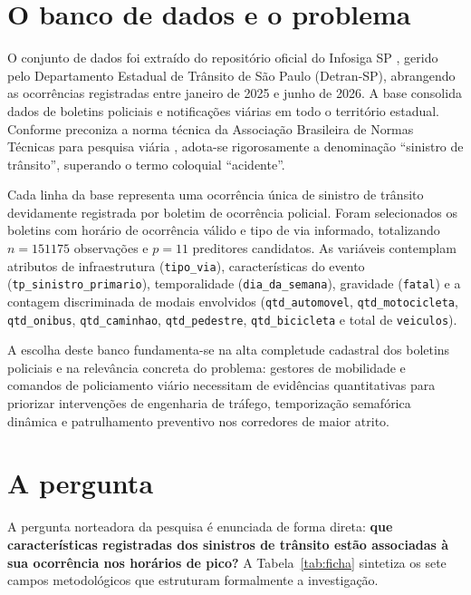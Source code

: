 \documentclass[
  article,
  12pt,
  oneside,
  a4paper,
  english,
  brazil
]{abntex2}\usepackage[]{graphicx}\usepackage[]{xcolor}
\begin{document}
\section{O banco de dados e o problema}

O conjunto de dados foi extraído do repositório oficial do Infosiga SP \cite{fonte_dados}, gerido pelo Departamento Estadual de Trânsito de São Paulo (Detran-SP), abrangendo as ocorrências registradas entre janeiro de 2025 e junho de 2026. A base consolida dados de boletins policiais e notificações viárias em todo o território estadual. Conforme preconiza a norma técnica da Associação Brasileira de Normas Técnicas para pesquisa viária \cite{abnt10697}, adota-se rigorosamente a denominação ``sinistro de trânsito'', superando o termo coloquial ``acidente''.

Cada linha da base representa uma ocorrência única de sinistro de trânsito devidamente registrada por boletim de ocorrência policial. Foram selecionados os boletins com horário de ocorrência válido e tipo de via informado, totalizando $n = \text{151175}$ observações e $p = \text{11}$ preditores candidatos. As variáveis contemplam atributos de infraestrutura (\texttt{tipo\_via}), características do evento (\texttt{tp\_sinistro\_primario}), temporalidade (\texttt{dia\_da\_semana}), gravidade (\texttt{fatal}) e a contagem discriminada de modais envolvidos (\texttt{qtd\_automovel}, \texttt{qtd\_motocicleta}, \texttt{qtd\_onibus}, \texttt{qtd\_caminhao}, \texttt{qtd\_pedestre}, \texttt{qtd\_bicicleta} e total de \texttt{veiculos}).

A escolha deste banco fundamenta-se na alta completude cadastral dos boletins policiais e na relevância concreta do problema: gestores de mobilidade e comandos de policiamento viário necessitam de evidências quantitativas para priorizar intervenções de engenharia de tráfego, temporização semafórica dinâmica e patrulhamento preventivo nos corredores de maior atrito.

\section{A pergunta}

A pergunta norteadora da pesquisa é enunciada de forma direta: \textbf{que características registradas dos sinistros de trânsito estão associadas à sua ocorrência nos horários de pico?} A Tabela~\ref{tab:ficha} sintetiza os sete campos metodológicos que estruturam formalmente a investigação.
\end{document}
